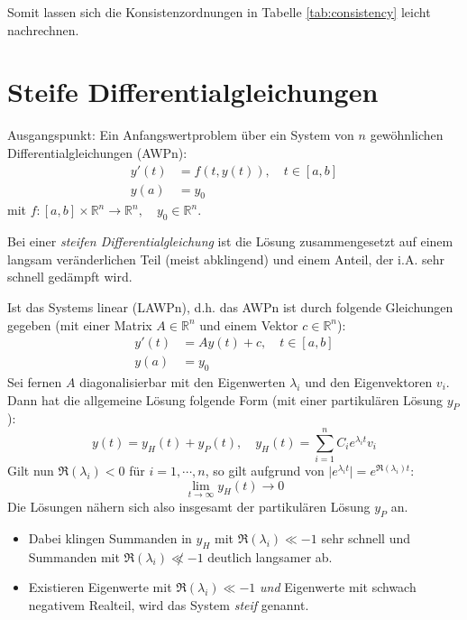 \documentclass[a4paper, 11pt, accentcolor = tud3b]{tudreport}
\newcommand{\abs}[1]{\ensuremath{{\lvert #1 \rvert}}}
\newcommand{\R}{\ensuremath{\mathbb{R}}}
\begin{document}
	                Somit lassen sich die Konsistenzordnungen in Tabelle \ref{tab:consistency} leicht nachrechnen.
	
	    \section{Steife Differentialgleichungen}
	        Ausgangspunkt: Ein Anfangswertproblem über ein System von \(n\) gewöhnlichen Differentialgleichungen (AWPn):
	        \begin{align*}
	        	y'(t) & = f(t, y(t)), \quad t \in [a, b] \\
	        	y(a)  & = y_0
	        \end{align*}
	        mit \( f : [a, b] \times \R^n \rightarrow \R^n, \quad y_0 \in \R^n \).
	        
	        Bei einer \textit{steifen Differentialgleichung} ist die Lösung zusammengesetzt auf einem langsam veränderlichen Teil (meist abklingend) und einem Anteil, der i.A. sehr schnell gedämpft wird.
	        
	        Ist das Systems linear (LAWPn), d.h. das AWPn ist durch folgende Gleichungen gegeben (mit einer Matrix \( A \in \R^n \) und einem Vektor \( c \in \R^n \)):
	        \begin{align*}
		        y'(t) & = Ay(t) + c, \quad t \in [a, b] \\
		        y(a) &= y_0
	        \end{align*}
	        Sei fernen \(A\) diagonalisierbar mit den Eigenwerten \(\lambda_i\) und den Eigenvektoren \(v_i\). Dann hat die allgemeine Lösung folgende Form (mit einer partikulären Lösung \(y_P\)):
	        \begin{equation*}
		        y(t) = y_H(t) + y_P(t), \quad y_H(t) = \sum_{i=1}^{n} C_i e^{\lambda_i t} v_i
	        \end{equation*}
	        Gilt nun \( \Re(\lambda_i) < 0 \) für \( i = 1, \cdots, n \), so gilt aufgrund von \( \abs{e^{\lambda_i t}} = e^{\Re(\lambda_i)t} \):
	        \begin{equation*}
		        \lim\limits_{t \rightarrow \infty} y_H(t) \rightarrow 0
	        \end{equation*}
	        Die Lösungen nähern sich also insgesamt der partikulären Lösung \( y_P \) an.
	        \begin{itemize}
	        	\item Dabei klingen Summanden in \(y_H\) mit \( \Re(\lambda_i) \ll -1 \) sehr schnell und Summanden mit \( \Re(\lambda_i) \not\ll -1 \) deutlich langsamer ab.
	        	\item Existieren Eigenwerte mit \( \Re(\lambda_i) \ll -1 \) \textit{und} Eigenwerte mit schwach negativem Realteil, wird das System \textit{steif} genannt.
	        \end{itemize}
        
\end{document}
